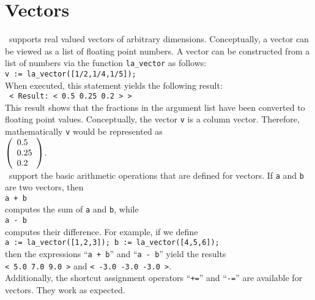 \section{Vectors}
\setlx\ supports real valued vectors of arbitrary dimensions.  Conceptually, a vector can be viewed as
a list of floating point numbers.  A vector can be constructed from a list of numbers via the
function \texttt{la\_vector} as follows:
\\[0.2cm]
\hspace*{1.3cm}
\texttt{v := la\_vector([1/2,1/4,1/5]);}
\\[0.2cm]
When executed, this statement yields the following result:
\\[0.2cm]
\hspace*{1.3cm}
\texttt{~< Result: < 0.5  0.25  0.2 > >~}
\\[0.2cm]
This result shows that the fractions in the argument list have been converted to floating point
values.  Conceptually, the vector \texttt{v} is a column vector.  Therefore, mathematically
\texttt{v} would be represented as
\\[0.2cm]
\hspace*{1.3cm}
$
\left(\begin{array}[c]{l}
  0.5  \\
  0.25 \\
  0.2
\end{array}\right)
$.
\\[0.2cm]
\setlx\ support the basic arithmetic operations that are defined for vectors.  If \texttt{a} and
\texttt{b} are two vectors, then 
\\[0.2cm]
\hspace*{1.3cm}
\texttt{a + b}
\\[0.2cm]
computes the sum of \texttt{a} and \texttt{b}, while 
\\[0.2cm]
\hspace*{1.3cm}
\texttt{a - b}
\\[0.2cm]
computes their difference.  For example, if we define
\\[0.2cm]
\hspace*{1.3cm}
\texttt{a := la\_vector([1,2,3]);   b := la\_vector([4,5,6]);}
\\[0.2cm]
then the expressions ``\texttt{a + b}'' and ``\texttt{a - b}'' yield the results
\\[0.2cm]
\hspace*{1.3cm}
\texttt{< 5.0  7.0  9.0 >} \quad and \quad \texttt{< -3.0  -3.0  -3.0 >}.
\\[0.2cm]
Additionally, the shortcut assignment operators ``\texttt{+=}'' and ``\texttt{-=}'' are available
for vectors.  They work as expected.

